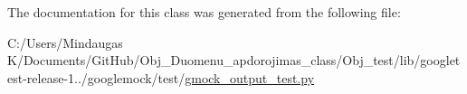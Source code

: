 The documentation for this class was generated from the following file\+:\begin{DoxyCompactItemize}
\item 
C\+:/\+Users/\+Mindaugas K/\+Documents/\+Git\+Hub/\+Obj\+\_\+\+Duomenu\+\_\+apdorojimas\+\_\+class/\+Obj\+\_\+test/lib/googletest-\/release-\/1../googlemock/test/\mbox{\hyperlink{_obj__test_2lib_2googletest-release-1_88_81_2googlemock_2test_2gmock__output__test_8py}{gmock\+\_\+output\+\_\+test.\+py}}\end{DoxyCompactItemize}
